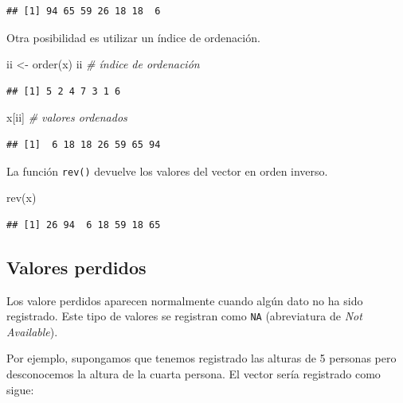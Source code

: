 \documentclass[
]{book}
\newenvironment{Shaded}{\begin{snugshade}}{\end{snugshade}}
\newcommand{\CommentTok}[1]{\textcolor[rgb]{0.56,0.35,0.01}{\textit{#1}}}
\newcommand{\FunctionTok}[1]{\textcolor[rgb]{0.00,0.00,0.00}{#1}}
\newcommand{\NormalTok}[1]{#1}
\newcommand{\OtherTok}[1]{\textcolor[rgb]{0.56,0.35,0.01}{#1}}
\theoremstyle{break}
\begin{document}
\begin{verbatim}
## [1] 94 65 59 26 18 18  6
\end{verbatim}

Otra posibilidad es utilizar un índice de ordenación.

\begin{Shaded}
\begin{Highlighting}[]
\NormalTok{ii }\OtherTok{\textless{}{-}} \FunctionTok{order}\NormalTok{(x)}
\NormalTok{ii  }\CommentTok{\# índice de ordenación}
\end{Highlighting}
\end{Shaded}

\begin{verbatim}
## [1] 5 2 4 7 3 1 6
\end{verbatim}

\begin{Shaded}
\begin{Highlighting}[]
\NormalTok{x[ii]  }\CommentTok{\# valores ordenados}
\end{Highlighting}
\end{Shaded}

\begin{verbatim}
## [1]  6 18 18 26 59 65 94
\end{verbatim}

La función \texttt{rev()} devuelve los valores del vector en orden inverso.

\begin{Shaded}
\begin{Highlighting}[]
\FunctionTok{rev}\NormalTok{(x)}
\end{Highlighting}
\end{Shaded}

\begin{verbatim}
## [1] 26 94  6 18 59 18 65
\end{verbatim}

\hypertarget{valores-perdidos}{%
\subsection{Valores perdidos}\label{valores-perdidos}}

Los valore perdidos aparecen normalmente cuando algún dato no ha sido registrado. Este tipo de
valores se registran como \texttt{NA} (abreviatura de \emph{Not Available}).

Por ejemplo, supongamos que tenemos registrado las alturas de 5 personas
pero desconocemos la altura de la cuarta persona. El vector sería
registrado como sigue:
\end{document}

